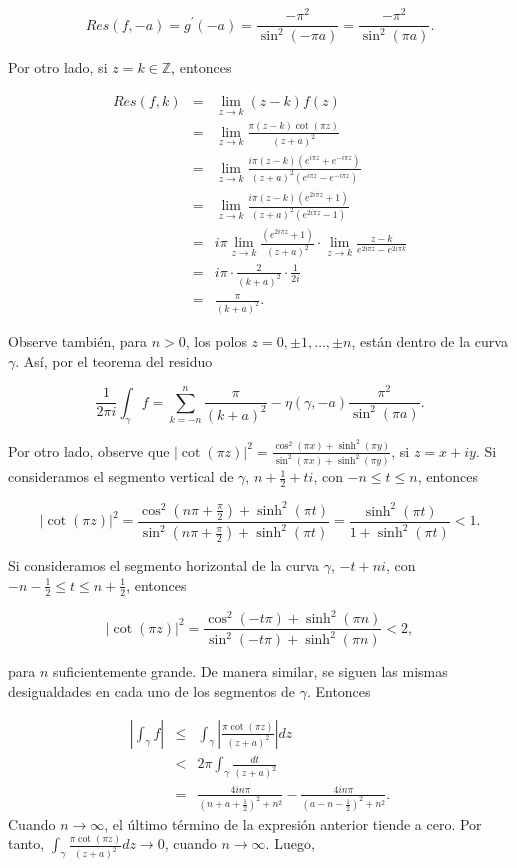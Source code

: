 \documentclass[12pt]{article}
\begin{document}
$$Res(f, -a) = g^\prime(-a) = \frac{- \pi^2 }{\sin^2(-\pi a)} = \frac{- \pi^2 }{\sin^2(\pi a)} .$$

Por otro lado, si $z = k \in \mathbb Z$, entonces

\begin{eqnarray*}
Res(f, k) &=& \lim_{z \to k} (z-k) f(z)\\
&=& \lim_{z \to k} \frac{\pi (z-k) \cot(\pi z) }{(z+a)^2} \\
&=& \lim_{z \to k} \frac{i \pi (z-k)(e^{i \pi z} + e^{- i \pi z}) }{(z+a)^2 (e^{i \pi z}-e^{-i \pi z})}\\
&=& \lim_{z \to k} \frac{i \pi (z-k)(e^{2 i \pi z} + 1) }{(z+a)^2 (e^{2i \pi z}-1)}\\
&=& i \pi \lim_{z \to k} \frac{(e^{2 i \pi z} + 1) }{(z+a)^2} \cdot  \lim_{z \to k} \frac{z-k}{e^{2 i \pi z }-e^{2 i \pi k}}\\
&=& i \pi \cdot \frac{2}{(k+a)^2} \cdot \frac{1}{2i} \\
&=& \frac{\pi}{(k+a)^2}.
\end{eqnarray*}

Observe también, para $n > 0$, los polos $z= 0, \pm 1, \ldots, \pm n$, están dentro de la curva $\gamma.$ Así, por el teorema del residuo 

$$ \frac{1}{2 \pi i} \int_{\gamma} f = \sum_{k=-n}^n \frac{\pi}{(k+a)^2} - \eta(\gamma, -a) \frac{\pi^2}{\sin^2(\pi a)}.$$

Por otro lado, observe que $\lvert \cot(\pi z) \rvert^2 = \frac{\cos^2(\pi x) + \sinh^2(\pi y)}{\sin^2(\pi x) + \sinh^2(\pi y)}$, si $z = x+iy$. Si consideramos el segmento vertical de $\gamma$, $n+\frac{1}{2}+ti$, con $-n \leq t \leq n$, entonces 

$$\lvert \cot(\pi z)\rvert^2 = \frac{\cos^2(n \pi + \frac{\pi}{2}) + \sinh^2(\pi t)}{\sin^2(n\pi + \frac{\pi}{2}) + \sinh^2(\pi t)} = \frac{\sinh^2(\pi t)}{1+\sinh^2(\pi t)}< 1.$$

Si consideramos el segmento horizontal de la curva $\gamma$, $-t+ni$, con $-n -\frac{1}{2}\leq t \leq n + \frac{1}{2}$, entonces

$$\lvert \cot(\pi z)\rvert^2 = \frac{\cos^2(-t \pi) + \sinh^2(\pi n)}{\sin^2(-t\pi) + \sinh^2(\pi n)} < 2,$$

para $n$ suficientemente grande. De manera similar, se siguen las mismas desigualdades en cada uno de los segmentos de $\gamma.$ Entonces

\begin{eqnarray*}
\left\lvert \int_{\gamma} f \right\rvert &\leq& \int_{\gamma} \left\lvert \frac{\pi \cot(\pi z)}{(z+a)^2} \right\rvert dz\\ &<& 2\pi \int_\gamma \frac{dt}{(z+a)^2}\\
&=& \frac{4in\pi}{(n+a +\frac{1}{2})^2 + n^2} - \frac{4in\pi}{(a -n -\frac{1}{2})^2 + n^2}.
\end{eqnarray*}
Cuando $n \to \infty$, el último término de la expresión anterior tiende a cero. Por tanto, $\int_\gamma \frac{\pi \cot(\pi z)}{(z+a)^2}dz \to 0$, cuando $n \to \infty$. Luego,
\end{document}
